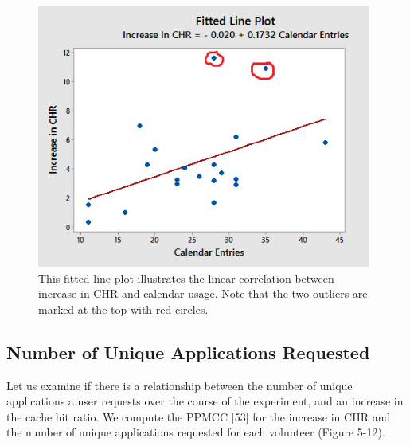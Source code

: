 \documentclass[12pt]{uthesis-v12}  %
\begin{document}
				 \begin{figure}[h]
				 	\centering
				 	\includegraphics[width = 110mm]{images/regressionPlot.png}
				 	\caption[Increase in CHR vs Calendar Entries - Plot]{This fitted line plot illustrates the linear correlation between increase in CHR and calendar usage. Note that the two outliers are marked at the top with red circles.}
				 \end{figure}
			
			\subsection{Number of Unique Applications Requested}
				
				Let us examine if there is a relationship between the number of unique applications a user requests over the course of the experiment, and an increase in the cache hit ratio. We compute the PPMCC [53] for the increase in CHR and the number of unique applications requested for each volunteer (Figure 5-12). 
				
\end{document}
